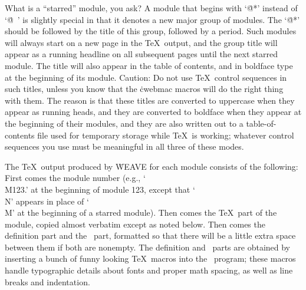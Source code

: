 What is a ``starred'' module, you ask? A module that begins with `\.{@*}'
instead of `\.{@\ }' is slightly special in that it denotes a new major
group of modules. The `\.{@*}' should be followed by the title of this
group, followed by a period. Such modules will always start on a new page
in the \TeX\ output, and the group title will appear as a running headline
on all subsequent pages until the next starred module. The title will also
appear in the table of contents, and in boldface type at the beginning of
its module. Caution:  Do not use \TeX\ control sequences in such titles,
unless you know that the \.{cwebmac} macros will do the right thing with
them. The reason is that these titles are converted to uppercase when
they appear as running heads, and they are converted to boldface when they
appear at the beginning of their modules, and they are also written out to
a table-of-contents file used for temporary storage while \TeX\ is
working; whatever control sequences you use must be meaningful in all
three of these modes.

The \TeX\ output produced by \.{WEAVE} for each module consists of
the following: First comes the module number (e.g., `\.{\\M123.}'
at the beginning of module 123, except that `\.{\\N}' appears in place of
`\.{\\M}' at the beginning of a starred module). Then comes the
\TeX\ part of the module, copied almost verbatim except as noted
below. Then comes the definition part and the \Cee\ part, formatted
so that there will be a little extra space between them if both are
nonempty. The definition and \Cee\ parts are obtained by inserting
a bunch of funny looking \TeX\ macros into the \Cee\ program; these
macros handle typographic details about fonts and proper math spacing,
as well as line breaks and indentation.

